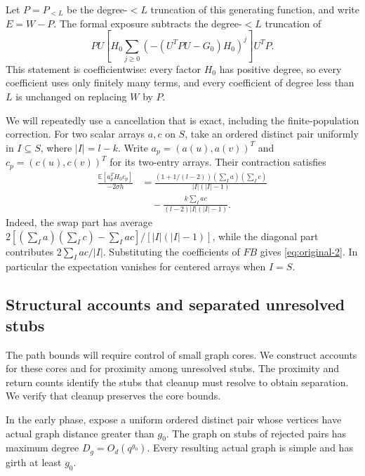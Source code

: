 Let $P=P_{<L}$ be the degree-$<L$ truncation of this generating function,
and write $E=W-P$. The formal exposure subtracts the degree-$<L$
truncation of
\begin{equation}
 P U\left[H_0\sum_{j\ge0}
       (-(U^TPU-G_0)H_0)^j\right]U^TP.
 \label{eq:original-1}
\end{equation}
This statement is coefficientwise: every factor $H_0$ has positive
degree, so every coefficient uses only finitely many terms, and every
coefficient of degree less than $L$ is unchanged on replacing $W$ by
$P$.

We will repeatedly use a cancellation that is exact, including the
finite-population correction. For two scalar arrays $a,c$ on $S$, take
an ordered distinct pair uniformly in $I\subseteq S$, where $|I|=l-k$.
Write $a_p=(a(u),a(v))^T$ and $c_p=(c(u),c(v))^T$ for its two-entry
arrays. Their contraction satisfies
\begin{equation}
 \begin{aligned}
 \frac{\mathbb E[a_p^TH_0c_p]}{-2\sigma h}
 &=\frac{(1+1/(l-2))(\sum_Ia)(\sum_Ic)}{|I|(|I|-1)}\\
 &\quad-\frac{k\sum_Iac}{(l-2)|I|(|I|-1)}.
 \end{aligned}
 \label{eq:original-2}
\end{equation}
Indeed, the swap part has average
$2[(\sum_Ia)(\sum_Ic)-\sum_Iac]/[|I|(|I|-1)]$, while the diagonal part
contributes $2\sum_Iac/|I|$. Substituting the coefficients of $FB$
gives \eqref{eq:original-2}. In particular the expectation vanishes for
centered arrays when $I=S$.

\subsection{Structural accounts and separated unresolved stubs}

The path bounds will require control of small graph cores. We construct
accounts for these cores and for proximity among unresolved stubs. The
proximity and return counts identify the stubs that cleanup must resolve
to obtain separation. We verify that cleanup preserves the core bounds.

In the early phase, expose a uniform ordered distinct pair whose
vertices have actual graph distance greater than $g_0$. The graph on
stubs of rejected pairs has maximum degree
$D_g=O_d(q^{g_0})$. Every resulting actual graph is simple and has girth
at least $g_0$.

